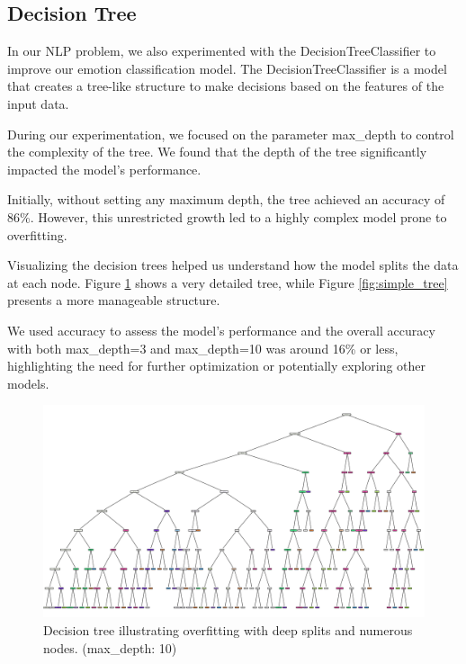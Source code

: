 \subsection{Decision Tree}

In our NLP problem, we also experimented with the DecisionTreeClassifier to improve our emotion classification model. The DecisionTreeClassifier is a model that creates a tree-like structure to make decisions based on the features of the input data.

During our experimentation, we focused on the parameter max\_depth to control the complexity of the tree. We found that the depth of the tree significantly impacted the model's performance.

Initially, without setting any maximum depth, the tree achieved an accuracy of 86\%. However, this unrestricted growth led to a highly complex model prone to overfitting.

Visualizing the decision trees helped us understand how the model splits the data at each node. Figure \ref{fig:complex_tree} shows a very detailed tree, while Figure \ref{fig:simple_tree} presents a more manageable structure.

We used accuracy to assess the model's performance and the overall accuracy with both max\_depth=3 and max\_depth=10 was around 16\% or less, highlighting the need for further optimization or potentially exploring other models. \autocite{decistion-tree}

\begin{figure}[H]
    \centering
    \includegraphics[width=0.8\columnwidth]{images/complex_tree.png}
    \caption{Decision tree illustrating overfitting with deep splits and numerous nodes. (max\_depth: 10)}
    \label{fig:complex_tree}
\end{figure}

